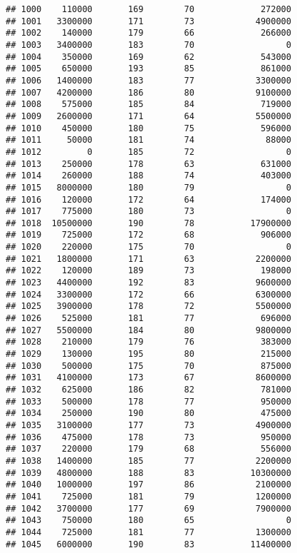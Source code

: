 \documentclass[
]{article}
\begin{document}
\begin{verbatim}
## 1000    110000       169        70             272000
## 1001   3300000       171        73            4900000
## 1002    140000       179        66             266000
## 1003   3400000       183        70                  0
## 1004    350000       169        62             543000
## 1005    650000       193        85             861000
## 1006   1400000       183        77            3300000
## 1007   4200000       186        80            9100000
## 1008    575000       185        84             719000
## 1009   2600000       171        64            5500000
## 1010    450000       180        75             596000
## 1011     50000       181        74              88000
## 1012         0       185        72                  0
## 1013    250000       178        63             631000
## 1014    260000       188        74             403000
## 1015   8000000       180        79                  0
## 1016    120000       172        64             174000
## 1017    775000       180        73                  0
## 1018  10500000       190        78           17900000
## 1019    725000       172        68             906000
## 1020    220000       175        70                  0
## 1021   1800000       171        63            2200000
## 1022    120000       189        73             198000
## 1023   4400000       192        83            9600000
## 1024   3300000       172        66            6300000
## 1025   3900000       178        72            5500000
## 1026    525000       181        77             696000
## 1027   5500000       184        80            9800000
## 1028    210000       179        76             383000
## 1029    130000       195        80             215000
## 1030    500000       175        70             875000
## 1031   4100000       173        67            8600000
## 1032    625000       186        82             781000
## 1033    500000       178        77             950000
## 1034    250000       190        80             475000
## 1035   3100000       177        73            4900000
## 1036    475000       178        73             950000
## 1037    220000       179        68             556000
## 1038   1400000       185        77            2200000
## 1039   4800000       188        83           10300000
## 1040   1000000       197        86            2100000
## 1041    725000       181        79            1200000
## 1042   3700000       177        69            7900000
## 1043    750000       180        65                  0
## 1044    725000       181        77            1300000
## 1045   6000000       190        83           11400000

\end{verbatim}
\end{document}
